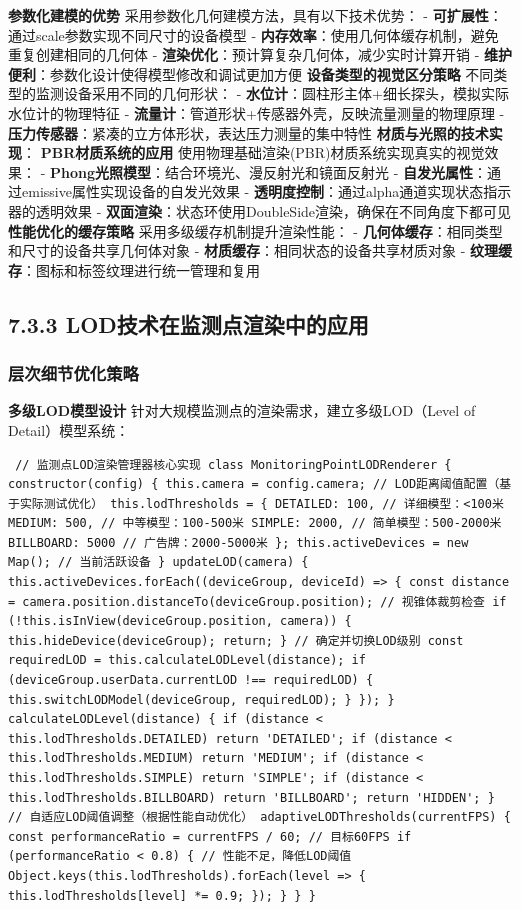 \textbf{参数化建模的优势} 采用参数化几何建模方法，具有以下技术优势： - \textbf{可扩展性}：通过scale参数实现不同尺寸的设备模型 - \textbf{内存效率}：使用几何体缓存机制，避免重复创建相同的几何体 - \textbf{渲染优化}：预计算复杂几何体，减少实时计算开销 - \textbf{维护便利}：参数化设计使得模型修改和调试更加方便 \textbf{设备类型的视觉区分策略} 不同类型的监测设备采用不同的几何形状： - \textbf{水位计}：圆柱形主体+细长探头，模拟实际水位计的物理特征 - \textbf{流量计}：管道形状+传感器外壳，反映流量测量的物理原理 - \textbf{压力传感器}：紧凑的立方体形状，表达压力测量的集中特性 \textbf{材质与光照的技术实现}： \textbf{PBR材质系统的应用} 使用物理基础渲染(PBR)材质系统实现真实的视觉效果： - \textbf{Phong光照模型}：结合环境光、漫反射光和镜面反射光 - \textbf{自发光属性}：通过emissive属性实现设备的自发光效果 - \textbf{透明度控制}：通过alpha通道实现状态指示器的透明效果 - \textbf{双面渲染}：状态环使用DoubleSide渲染，确保在不同角度下都可见 \textbf{性能优化的缓存策略} 采用多级缓存机制提升渲染性能： - \textbf{几何体缓存}：相同类型和尺寸的设备共享几何体对象 - \textbf{材质缓存}：相同状态的设备共享材质对象 - \textbf{纹理缓存}：图标和标签纹理进行统一管理和复用 \subsection{7.3.3 LOD技术在监测点渲染中的应用}\label{lodux6280ux672fux5728ux76d1ux6d4bux70b9ux6e32ux67d3ux4e2dux7684ux5e94ux7528} \subsubsection{层次细节优化策略}\label{ux5c42ux6b21ux7ec6ux8282ux4f18ux5316ux7b56ux7565} \textbf{多级LOD模型设计} 针对大规模监测点的渲染需求，建立多级LOD（Level of Detail）模型系统： \begin{verbatim} // 监测点LOD渲染管理器核心实现 class MonitoringPointLODRenderer { constructor(config) { this.camera = config.camera; // LOD距离阈值配置（基于实际测试优化） this.lodThresholds = { DETAILED: 100, // 详细模型：<100米 MEDIUM: 500, // 中等模型：100-500米 SIMPLE: 2000, // 简单模型：500-2000米 BILLBOARD: 5000 // 广告牌：2000-5000米 }; this.activeDevices = new Map(); // 当前活跃设备 } updateLOD(camera) { this.activeDevices.forEach((deviceGroup, deviceId) => { const distance = camera.position.distanceTo(deviceGroup.position); // 视锥体裁剪检查 if (!this.isInView(deviceGroup.position, camera)) { this.hideDevice(deviceGroup); return; } // 确定并切换LOD级别 const requiredLOD = this.calculateLODLevel(distance); if (deviceGroup.userData.currentLOD !== requiredLOD) { this.switchLODModel(deviceGroup, requiredLOD); } }); } calculateLODLevel(distance) { if (distance < this.lodThresholds.DETAILED) return 'DETAILED'; if (distance < this.lodThresholds.MEDIUM) return 'MEDIUM'; if (distance < this.lodThresholds.SIMPLE) return 'SIMPLE'; if (distance < this.lodThresholds.BILLBOARD) return 'BILLBOARD'; return 'HIDDEN'; } // 自适应LOD阈值调整（根据性能自动优化） adaptiveLODThresholds(currentFPS) { const performanceRatio = currentFPS / 60; // 目标60FPS if (performanceRatio < 0.8) { // 性能不足，降低LOD阈值 Object.keys(this.lodThresholds).forEach(level => { this.lodThresholds[level] *= 0.9; }); } } } \end{verbatim} 